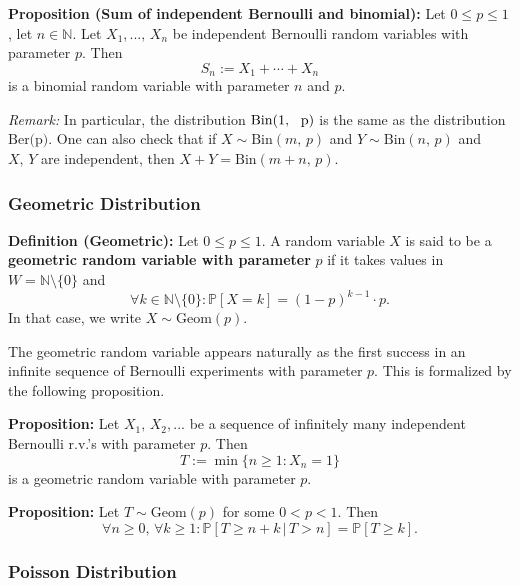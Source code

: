 \documentclass[a4paper]{extarticle}
\begin{document}
\begin{cbox}
    \textbf{Proposition (Sum of independent Bernoulli and binomial):} Let \(0 \leq p \leq 1\), let \(n \in \mathbb{N}\). Let \(X_1,..., \, X_n\) be independent Bernoulli random variables with parameter \(p\). Then
    \[
        S_n := X_1 + \cdots + X_n
    \]
    is a binomial random variable with parameter \(n\) and \(p\).
\end{cbox}

\textit{Remark:} In particular, the distribution \(\text{Bin(1, \, p)}\) is the same as the distribution \(\text{Ber(p)}\). One can also check that if \(X \sim \text{Bin}(m, \, p)\) and \(Y \sim \text{Bin}(n, \, p)\) and \(X, \, Y\) are independent, then \(X + Y = \text{Bin}(m + n, \, p)\).

\subsubsection{Geometric Distribution}

\textbf{Definition (Geometric):} Let \(0 \leq p \leq 1\). A random variable \(X\) is said to be a \textbf{geometric random variable with parameter} \(p\) if it takes values in \(W = \mathbb{N} \setminus \{0\}\) and
\[
    \forall k \in \mathbb{N} \setminus \{0\} : \mathbb{P}[X = k] = (1 - p)^{k - 1} \cdot p.
\]
In that case, we write \(X \sim \text{Geom}(p)\).

The geometric random variable appears naturally as the first success in an infinite sequence of Bernoulli experiments with parameter \(p\). This is formalized by the following proposition.

\begin{cbox}
    \textbf{Proposition:} Let \(X_1, \, X_2,...\) be a sequence of infinitely many independent Bernoulli r.v.'s with parameter \(p\). Then
    \[
        T := \min \{n \geq 1 : X_n = 1\}
    \]
    is a geometric random variable with parameter \(p\).
\end{cbox}

\begin{cbox}
    \textbf{Proposition:} Let \(T \sim \text{Geom}(p)\) for some \(0 < p < 1\). Then
    \[
        \forall n \geq 0, \, \forall k \geq 1 : \mathbb{P}[T \geq n + k \, | \, T > n] = \mathbb{P}[T \geq k].
    \]
\end{cbox}

\subsubsection{Poisson Distribution}
\end{document}
